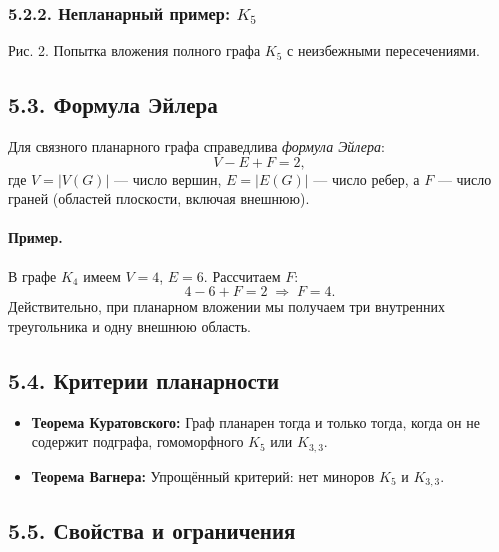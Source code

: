 \documentclass{article}
\begin{document}
\subsubsection*{5.2.2. Непланарный пример: $K_5$}

\begin{center}

\small Рис. 2. Попытка вложения полного графа $K_5$ с неизбежными пересечениями.
\end{center}

\subsection*{5.3. Формула Эйлера}

Для связного планарного графа справедлива \emph{формула Эйлера}:
\[
  V - E + F = 2,
\]
где $V = |V(G)|$ — число вершин, $E = |E(G)|$ — число ребер, а $F$ — число граней (областей плоскости, включая внешнюю).

\paragraph{Пример.} В графе $K_4$ имеем $V=4$, $E=6$. Рассчитаем $F$:
\[
  4 - 6 + F = 2 \;\Longrightarrow\; F = 4.
\]
Действительно, при планарном вложении мы получаем три внутренних треугольника и одну внешнюю область.

\subsection*{5.4. Критерии планарности}

\begin{itemize}[leftmargin=*]
  \item \textbf{Теорема Куратовского:} Граф планарен тогда и только тогда, когда он не содержит подграфа, гомоморфного $K_5$ или $K_{3,3}$.
  \item \textbf{Теорема Вагнера:} Упрощённый критерий: нет миноров $K_5$ и $K_{3,3}$.
\end{itemize}

\subsection*{5.5. Свойства и ограничения}
\end{document}
